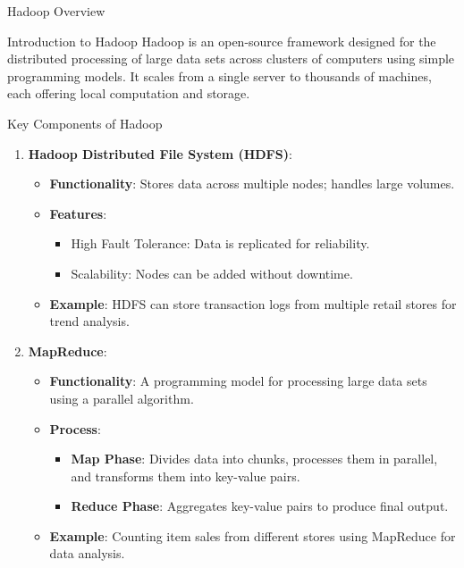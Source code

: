 \documentclass[aspectratio=169]{beamer}
\begin{document}
\begin{frame}[fragile]{Hadoop Overview}
    \begin{block}{Introduction to Hadoop}
        Hadoop is an open-source framework designed for the distributed processing of large data sets across clusters of computers using simple programming models. It scales from a single server to thousands of machines, each offering local computation and storage.
    \end{block}
\end{frame}

\begin{frame}[fragile]{Key Components of Hadoop}
    \begin{enumerate}
        \item \textbf{Hadoop Distributed File System (HDFS)}:
        \begin{itemize}
            \item \textbf{Functionality}: Stores data across multiple nodes; handles large volumes.
            \item \textbf{Features}:
            \begin{itemize}
                \item High Fault Tolerance: Data is replicated for reliability.
                \item Scalability: Nodes can be added without downtime.
            \end{itemize}
            \item \textbf{Example}: HDFS can store transaction logs from multiple retail stores for trend analysis.
        \end{itemize}
        
        \item \textbf{MapReduce}:
        \begin{itemize}
            \item \textbf{Functionality}: A programming model for processing large data sets using a parallel algorithm.
            \item \textbf{Process}:
            \begin{itemize}
                \item \textbf{Map Phase}: Divides data into chunks, processes them in parallel, and transforms them into key-value pairs.
                \item \textbf{Reduce Phase}: Aggregates key-value pairs to produce final output.
            \end{itemize}
            \item \textbf{Example}: Counting item sales from different stores using MapReduce for data analysis.
        \end{itemize}
    \end{enumerate}
\end{frame}
\end{document}
